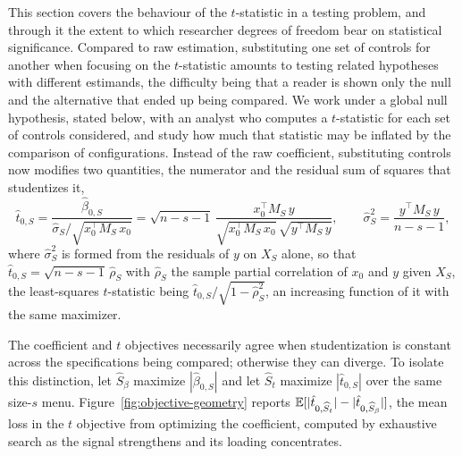 This section covers the behaviour of the $t$-statistic in a testing
problem, and through it the extent to which researcher degrees of freedom
bear on statistical significance. Compared to raw estimation,
substituting one set of controls for another when focusing on the
$t$-statistic amounts to testing related hypotheses with different
estimands, the difficulty being that a reader is shown only the null and
the alternative that ended up being compared. We work under a global null
hypothesis, stated below, with an analyst who computes a $t$-statistic
for each set of controls considered, and study how much that statistic
may be inflated by the comparison of configurations. Instead of the raw
coefficient, substituting controls now modifies two quantities, the
numerator and the residual sum of squares that studentizes it,
\begin{equation}\label{eq:tstat-def}
        \hat t_{0,S}
        =
        \frac{\hat\beta_{0,S}}{\hat\sigma_S / \sqrt{x_0^\top M_S\, x_0}}
        =
        \sqrt{n-s-1}\,
        \frac{x_0^\top M_S\, y}
        {\sqrt{x_0^\top M_S\, x_0}\, \sqrt{y^\top M_S\, y}},
        \qquad
        \hat\sigma_S^2 = \frac{y^\top M_S\, y}{n-s-1},
\end{equation}
where $\hat\sigma_S^2$ is formed from the residuals of $y$ on $X_S$
alone, so that $\hat t_{0,S} = \sqrt{n-s-1}\, \hat\rho_S$ with
$\hat\rho_S$ the sample partial correlation of $x_0$ and $y$ given $X_S$,
the least-squares $t$-statistic being
$\hat t_{0,S} / \sqrt{1 - \hat\rho_S^2}$, an increasing function of it
with the same maximizer.

The coefficient and $t$ objectives necessarily agree when studentization is
constant across the specifications being compared; otherwise they can diverge.
To isolate this distinction, let
$\widehat S_\beta$ maximize $|\hat\beta_{0,S}|$ and let $\widehat S_t$ maximize
$|\hat t_{0,S}|$ over the same size-$s$ menu. Figure~\ref{fig:objective-geometry}
reports
$\mathbb{E}[|\hat t_{0,\widehat S_t}|-|\hat t_{0,\widehat S_\beta}|]$, the mean loss
in the $t$ objective from optimizing the coefficient, computed by exhaustive
search as the signal strengthens and its loading concentrates.

